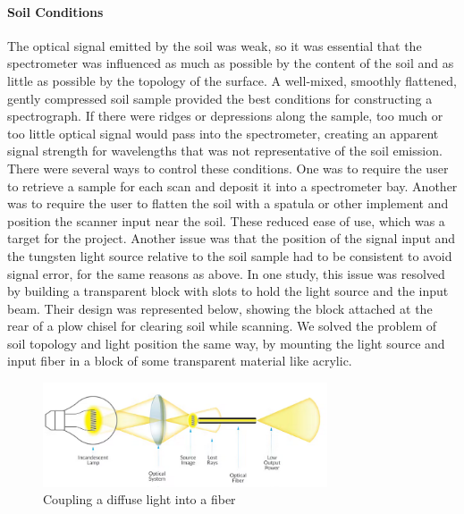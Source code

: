 \paragraph{Soil Conditions} The optical signal emitted by the soil was weak, so it was essential that the spectrometer was influenced as much as possible by the content of the soil and as little as possible by the topology of the surface. A well-mixed, smoothly flattened, gently compressed soil sample provided the best conditions for constructing a spectrograph. If there were ridges or depressions along the sample, too much or too little optical signal would pass into the spectrometer, creating an apparent signal strength for wavelengths that was not representative of the soil emission. There were several ways to control these conditions. One was to require the user to retrieve a sample for each scan and deposit it into a spectrometer bay. Another was to require the user to flatten the soil with a spatula or other implement and position the scanner input near the soil. These reduced ease of use, which was a target for the project. Another issue was that the position of the signal input and the tungsten light source relative to the soil sample had to be consistent to avoid signal error, for the same reasons as above. In one study\cite[]{Mouazen2007}, this issue was resolved by building a transparent block with slots to hold the light source and the input beam. Their design was represented below, showing the block attached at the rear of a plow chisel for clearing soil while scanning. We solved the problem of soil topology and light position the same way, by mounting the light source and input fiber in a block of some transparent material like acrylic.

\begin{figure}[H]
    \caption{Coupling a diffuse light into a fiber}
    \centering
    \includegraphics[width=0.75\textwidth]{images/CouplingDiffuseLighttoFiber.png}
\end{figure}

